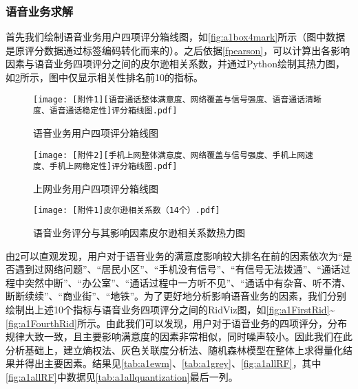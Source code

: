 \documentclass{MathorCupmodeling}
\begin{document}
	\subsubsection{语音业务求解}
	首先我们绘制语音业务用户四项评分箱线图，如\textcolor{blue}{\cref{fig:a1box4mark}}所示（图中数据是原评分数据通过标签编码转化而来的）。之后依据\textcolor{blue}{\eqref{fpearson}}，可以计算出各影响因素与语音业务四项评分之间的皮尔逊相关系数，并通过Python绘制其热力图，如\textcolor{blue}{\cref{fig:a1pearson}}所示，图中仅显示相关性排名前10的指标。
	\begin{figure}[htbp]
		\centering
		\begin{minipage}{0.48\linewidth}
			\centering
			\texttt{[image: [附件1][语音通话整体满意度、网络覆盖与信号强度、语音通话清晰度、语音通话稳定性]评分箱线图.pdf]}
			\caption{语音业务用户四项评分箱线图}
			\label{fig:a1box4mark}
		\end{minipage}
		\begin{minipage}{0.48\linewidth}
			\centering
			\texttt{[image: [附件2][手机上网整体满意度、网络覆盖与信号强度、手机上网速度、手机上网稳定性]评分箱线图.pdf]}
			\caption{上网业务用户四项评分箱线图}
			\label{fig:a2box4mark}
		\end{minipage}
	\end{figure}
	\begin{figure}[h!t]
		\centerline{\texttt{[image: [附件1]皮尔逊相关系数（14个）.pdf]}}
		\caption{语音业务评分与其影响因素皮尔逊相关系数热力图}\label{fig:a1pearson}
	\end{figure}
	由\textcolor{blue}{\cref{fig:a1pearson}}可以直观发现，用户对于语音业务的满意度影响较大排名在前的因素依次为“是否遇到过网络问题”、“居民小区”、“手机没有信号”、“有信号无法拨通”、“通话过程中突然中断”、“办公室”、“通话过程中一方听不见”、“通话中有杂音、听不清、断断续续”、“商业街”、“地铁”。为了更好地分析影响语音业务的因素，我们分别绘制出上述10个指标与语音业务四项评分之间的RidViz图，如\textcolor{blue}{\cref{fig:a1FirstRid}}\textasciitilde\textcolor{blue}{\cref{fig:a1FourthRid}}所示。由此我们可以发现，用户对于语音业务的四项评分，分布规律大致一致，且主要影响满意度的因素非常相似，同时噪声较小。因此我们在此分析基础上，建立熵权法、灰色关联度分析法、随机森林模型在整体上求得量化结果并得出主要因素。结果见\textcolor{blue}{\cref{tab:a1ewm}}、\textcolor{blue}{\cref{tab:a1grey}}、\textcolor{blue}{\cref{fig:a1allRF}}，其中\textcolor{blue}{\cref{fig:a1allRF}}中数据见\textcolor{blue}{\cref{tab:a1allquantization}}最后一列。
	
\end{document}
